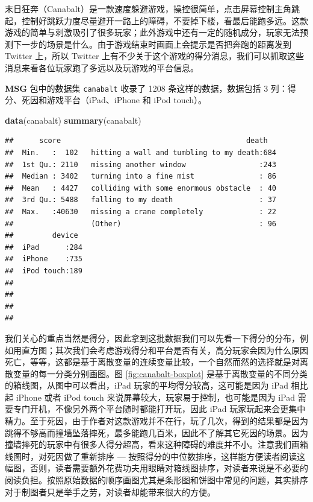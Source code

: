 \documentclass[
  b5paper,
  UTF8,twoside]{book}
\newenvironment{Shaded}{\begin{snugshade}}{\end{snugshade}}
\newcommand{\FunctionTok}[1]{\textcolor[rgb]{0.13,0.29,0.53}{\textbf{#1}}}
\newcommand{\NormalTok}[1]{#1}
\begin{document}
末日狂奔（Canabalt）是一款速度躲避游戏，操控很简单，点击屏幕控制主角跳起，控制好跳跃力度尽量避开一路上的障碍，不要掉下楼，看最后能跑多远。这款游戏的简单与刺激吸引了很多玩家；此外游戏中还有一定的随机成分，玩家无法预测下一步的场景是什么。由于游戏结束时画面上会提示是否把奔跑的距离发到 Twitter 上，所以 Twitter 上有不少关于这个游戏的得分消息，我们可以抓取这些消息来看各位玩家跑了多远以及玩游戏的平台信息。

\textbf{MSG} 包中的数据集 \texttt{canabalt} 收录了 1208 条这样的数据，数据包括 3 列：得分、死因和游戏平台（iPad、iPhone 和 iPod touch）。

\begin{Shaded}
\begin{Highlighting}[]
\FunctionTok{data}\NormalTok{(canabalt)}
\FunctionTok{summary}\NormalTok{(canabalt)}
\end{Highlighting}
\end{Shaded}

\begin{verbatim}
##      score                                           death    
##  Min.   :  102   hitting a wall and tumbling to my death:684  
##  1st Qu.: 2110   missing another window                 :243  
##  Median : 3402   turning into a fine mist               : 86  
##  Mean   : 4427   colliding with some enormous obstacle  : 40  
##  3rd Qu.: 5488   falling to my death                    : 37  
##  Max.   :40630   missing a crane completely             : 22  
##                  (Other)                                : 96  
##         device   
##  iPad      :284  
##  iPhone    :735  
##  iPod touch:189  
##                  
##                  
##                  
## 
\end{verbatim}

我们关心的重点当然是得分，因此拿到这批数据我们可以先看一下得分的分布，例如用直方图；其次我们会考虑游戏得分和平台是否有关，高分玩家会因为什么原因死亡，等等，这都是基于离散变量的连续变量比较，一个自然而然的选择就是对离散变量的每一分类分别画图。图 \ref{fig:canabalt-boxplot} 是基于离散变量的不同分类的箱线图，从图中可以看出，iPad 玩家的平均得分较高，这可能是因为 iPad 相比起 iPhone 或者 iPod touch 来说屏幕较大，玩家易于控制，也可能是因为 iPad 需要专门开机，不像另外两个平台随时都能打开玩，因此 iPad 玩家玩起来会更集中精力。至于死因，由于作者对这款游戏并不在行，玩了几次，得到的结果都是因为跳得不够高而撞墙坠落摔死，最多能跑几百米，因此不了解其它死因的场景。因为撞墙摔死的玩家中有很多人得分超高，看来这种障碍的难度并不小。注意我们画箱线图时，对死因做了重新排序 --- 按照得分的中位数排序，这样能方便读者阅读这幅图，否则，读者需要额外花费功夫用眼睛对箱线图排序，对读者来说是不必要的阅读负担。按照原始数据的顺序画图尤其是条形图和饼图中常见的问题，其实排序对于制图者只是举手之劳，对读者却能带来很大的方便。
\end{document}
